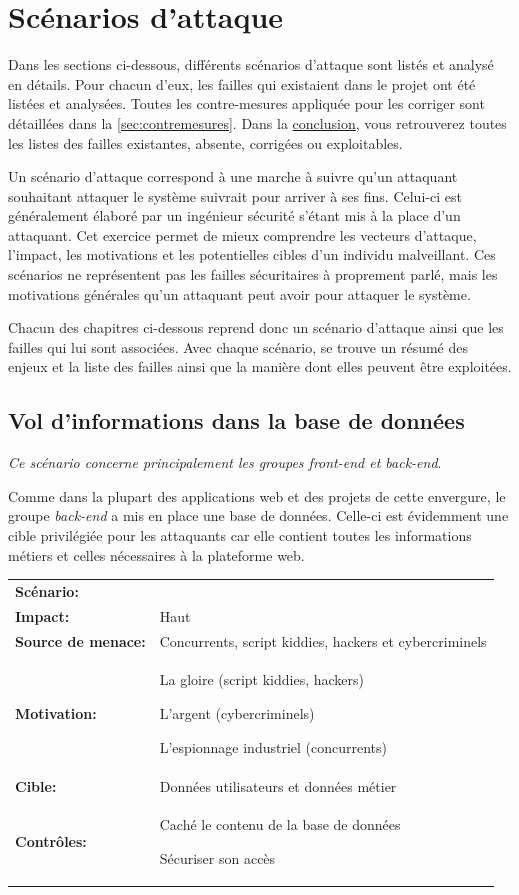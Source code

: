 \documentclass[12pt]{article}
\begin{document}
\section{Scénarios d'attaque}
\label{sec:scenarios}

Dans les sections ci-dessous, différents scénarios d'attaque sont listés et analysé en détails. Pour chacun d'eux, les failles qui existaient dans le projet ont été listées et analysées. Toutes les contre-mesures appliquée pour les corriger sont détaillées dans la \autoref{sec:contremesures}. Dans la \hyperref[sec:conclusion]{conclusion}, vous retrouverez toutes les listes des failles existantes, absente, corrigées ou exploitables.

Un scénario d'attaque correspond à une marche à suivre qu'un attaquant souhaitant attaquer le système suivrait pour arriver à ses fins. Celui-ci est généralement élaboré par un ingénieur sécurité s'étant mis à la place d'un attaquant. Cet exercice permet de mieux comprendre les vecteurs d'attaque, l'impact, les motivations et les potentielles cibles d'un individu malveillant. Ces scénarios ne représentent pas les failles sécuritaires à proprement parlé, mais les motivations générales qu'un attaquant peut avoir pour attaquer le système.

Chacun des chapitres ci-dessous reprend donc un scénario d'attaque ainsi que les failles qui lui sont associées. Avec chaque scénario, se trouve un résumé des enjeux et la liste des failles ainsi que la manière dont elles peuvent être exploitées.

\subsection{Vol d'informations dans la base de données}

\emph{Ce scénario concerne principalement les groupes front-end et back-end}.
\medskip

Comme dans la plupart des applications web et des projets de cette envergure, le groupe \emph{back-end} a mis en place une base de données. Celle-ci est évidemment une cible privilégiée pour les attaquants car elle contient toutes les informations métiers et celles nécessaires à la plateforme web.
\medskip

\renewcommand{\arraystretch}{1.6}
\begin{tabular}{@{}p{4cm}p{12cm}}
\textbf{Scénario:} &  \\
\textbf{Impact:} & Haut \\
\textbf{Source de menace: } & Concurrents, script kiddies, hackers et cybercriminels \\
\textbf{Motivation:} & La gloire (script kiddies, hackers)

L'argent (cybercriminels)

L'espionnage industriel (concurrents) \\
\textbf{Cible:} & Données utilisateurs et données métier \\
\textbf{Contrôles:} & Caché le contenu de la base de données

Sécuriser son accès
\end{tabular}
\renewcommand{\arraystretch}{1}
\end{document}
